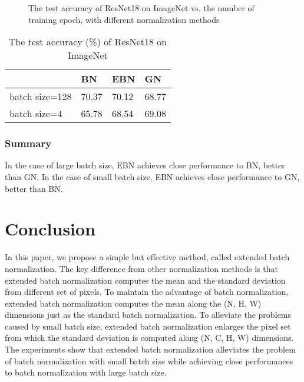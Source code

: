 \documentclass[runningheads]{llncs}
\begin{document}
\begin{figure}[!htb]
\centering
{}
\centering
{}
\caption{The test accuracy of ResNet18 on ImageNet vs. the number of training epoch, with different normalization methods}
\label{fig_imagenet}
\end{figure}

\begin{table}[!ht]
\caption{The test accuracy (\%) of ResNet18 on ImageNet}
\label{tab_imagenet}
\centering
\begin{tabular}{l|lll}
\hline
  & BN & EBN & GN \\
\hline
batch size=128     & 70.37  & 	70.12 & 68.77     \\
batch size=4       & 65.78  & 68.54 & 69.08     \\
\hline
\end{tabular}
\end{table}

\subsubsection{Summary}  In the case of large batch size, EBN achieves close performance to BN, better than GN.  In the case of small batch size, EBN achieves close performance to GN, better than BN. 



\section{Conclusion}

In this paper, we propose a simple but effective method, called extended batch normalization. The key difference from other normalization methods is that extended batch normalization computes the mean and the standard deviation from different set of pixels. 
To maintain the advantage of batch normalization, extended batch normalization computes the mean along the (N, H, W) dimensions just as the standard batch normalization. To alleviate the problems caused by small batch size, extended batch normalization enlarges the pixel set from which the standard deviation is computed along (N, C, H, W) dimensions. 
The experiments show that extended batch normalization alleviates the problem of batch normalization with small batch size while achieving close performances to batch normalization with large batch size.
\end{document}
